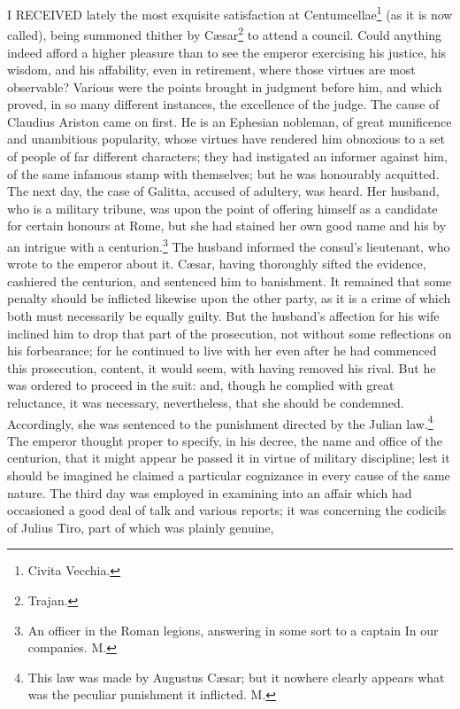 I RECEIVED lately the most exquisite satisfaction at Centumcellae\footnote{Civita Vecchia.}
(as it is now called), being summoned thither by Cæsar\footnote{Trajan.}
to attend a council. Could anything indeed afford a higher pleasure than
to see the emperor exercising his justice, his wisdom, and his affability,
even in retirement, where those virtues are most observable? Various were
the points brought in judgment before him, and which proved, in so many
different instances, the excellence of the judge. The cause of Claudius
Ariston came on first. He is an Ephesian nobleman, of great munificence
and unambitious popularity, whose virtues have rendered him obnoxious to a
set of people of far different characters; they had instigated an informer
against him, of the same infamous stamp with themselves; but he was
honourably acquitted. The next day, the case of Galitta, accused of
adultery, was heard. Her husband, who is a military tribune, was upon the
point of offering himself as a candidate for certain honours at Rome, but
she had stained her own good name and his by an intrigue with a centurion.\footnote{An officer in the Roman
legions, answering in some sort to a captain In our companies. M.}
The husband informed the consul's lieutenant, who wrote to the emperor
about it. Cæsar, having thoroughly sifted the evidence, cashiered the
centurion, and sentenced him to banishment. It remained that some penalty
should be inflicted likewise upon the other party, as it is a crime of
which both must necessarily be equally guilty. But the husband's affection
for his wife inclined him to drop that part of the prosecution, not
without some reflections on his forbearance; for he continued to live with
her even after he had commenced this prosecution, content, it would seem,
with having removed his rival. But he was ordered to proceed in the suit:
and, though he complied with great reluctance, it was necessary,
nevertheless, that she should be condemned. Accordingly, she was sentenced
to the punishment directed by the Julian law.\footnote{This law was made by
Augustus Cæsar; but it nowhere clearly appears what was the peculiar
punishment it inflicted. M.} The emperor thought
proper to specify, in his decree, the name and office of the centurion,
that it might appear he passed it in virtue of military discipline; lest
it should be imagined he claimed a particular cognizance in every cause of
the same nature. The third day was employed in examining into an affair
which had occasioned a good deal of talk and various reports; it was
concerning the codicils of Julius Tiro, part of which was plainly genuine,
